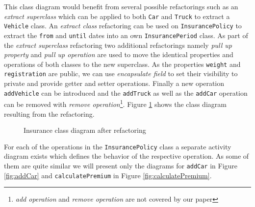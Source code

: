 \documentclass{llncs}
\begin{document}
This class 
diagram would benefit from several possible refactorings such as an \textit{extract superclass} which can be applied to both \texttt{Car} 
and \texttt{Truck} to extract a \texttt{Vehicle} class. An \textit{extract class} refactoring can be used on \texttt{InsurancePolicy} to 
extract the \texttt{from} and \texttt{until} dates into an own \texttt{InsurancePeriod} class. As part of the 
\textit{extract superclass} refactoring two additional refactorings namely \textit{pull up property} and \textit{pull up operation} are 
used to move the identical properties and operations of both classes to the new superclass. As the 
properties \texttt{weight} and \texttt{registration} are public, we can use \textit{encapsulate field} to set their visibility to private and 
provide getter and setter operations. Finally a new operation \texttt{addVehicle} can be introduced and the \texttt{addTruck} as well as 
the \texttt{addCar} operation can be removed with \textit{remove operation}\footnote{\textit{add operation} and \textit{remove operation} are not covered by our paper}. 
Figure \ref{fig:classdiagramcomplexRef} shows the class diagram resulting from the refactoring.

\begin{figure}[h!t]
 \centering
 \caption{Insurance class diagram after refactoring}
 \label{fig:classdiagramcomplexRef}
\end{figure}

For each of the operations in the \texttt{InsurancePolicy} class a separate activity diagram exists which defines the behavior 
of the respective operation. As some of them are quite similar we will present only the diagrams for \texttt{addCar} in Figure 
\ref{fig:addCar} and \texttt{calculatePremium} in  Figure \ref{fig:calculatePremium}.
\end{document}
